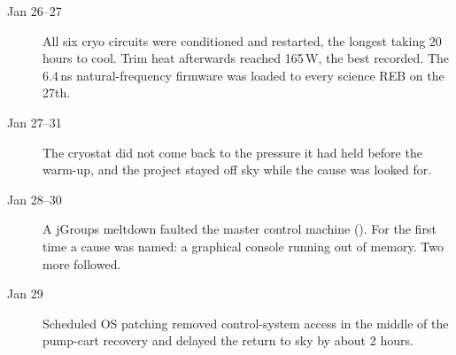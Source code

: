 \begin{description}
\item[Jan 26--27] All six cryo circuits were conditioned and
  restarted, the longest taking 20 hours to cool.  Trim heat afterwards
  reached 165\,W, the best recorded.  The 6.4\,ns natural-frequency
  firmware was loaded to every science REB on the 27th.

\item[Jan 27--31] The cryostat did not come back to the pressure it had
  held before the warm-up, and the project stayed off sky while the
  cause was looked for.

\item[Jan 28--30] A jGroups meltdown faulted the master control
  machine ().  For the first time a cause was named:
  a graphical console running out of memory.  Two more followed.

\item[Jan 29] Scheduled OS patching removed control-system access in
  the middle of the pump-cart recovery and delayed the return to sky by
  about 2 hours.

\end{description}

